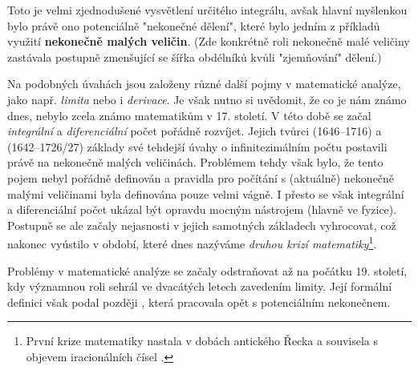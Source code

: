 Toto je velmi zjednodušené vysvětlení určitého integrálu, avšak hlavní myšlenkou bylo právě ono potenciálně "nekonečné dělení", které bylo jedním z příkladů využití \textbf{nekonečně malých veličin}. (Zde konkrétně roli nekonečně malé veličiny zastávala postupně zmenšující se šířka obdélníků kvůli "zjemňování" dělení.)\par
Na podobných úvahách jsou založeny různé další pojmy v matematické analýze, jako např. \emph{limita} nebo i \emph{derivace}. Je však nutno si uvědomit, že co je nám známo dnes, nebylo zcela známo matematikům v 17. století. V této době se začal \emph{integrální} a \emph{diferenciální} počet pořádně rozvíjet. Jejich tvůrci  (1646--1716) a  (1642--1726/27) základy své tehdejší úvahy o infinitezimálním počtu postavili právě na nekonečně malých veličinách. Problémem tehdy však bylo, že tento pojem nebyl pořádně definován a pravidla pro počítání s (aktuálně) nekonečně malými veličinami byla definována pouze velmi vágně. I přesto se však integrální a diferenciální počet ukázal být opravdu mocným nástrojem (hlavně ve fyzice). Postupně se ale začaly nejasnosti v jejich samotných základech vyhrocovat, což nakonec vyústilo v období, které dnes nazýváme \emph{druhou krizí matematiky}\footnote{První krize matematiky nastala v dobách antického Řecka a souvisela s objevem iracionálních čísel .}.\par
Problémy v matematické analýze se začaly odstraňovat až na počátku 19. století, kdy významnou roli sehrál ve dvacátých letech  zavedením limity. Její formální definici však podal později , která pracovala opět s potenciálním nekonečnem. \cite{Fuchs2003}%